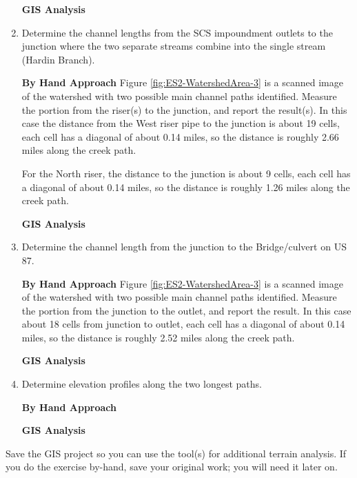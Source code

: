 \documentclass[12pt]{article}
\begin{document}
\begin{enumerate}
\textbf{GIS Analysis}

\clearpage

\item Determine the channel lengths from the SCS impoundment outlets to the junction where the two separate streams combine into the single stream (Hardin Branch).

\textbf{By Hand Approach}
Figure \ref{fig:ES2-WatershedArea-3} is a scanned image of the watershed with two possible main channel paths identified.  Measure the portion from the riser(s) to the junction, and report the result(s).  In this case the distance from the West riser pipe to the junction is about 19 cells, each cell has a diagonal of about 0.14 miles, so the distance is roughly 2.66 miles along the creek path.

For the North riser, the distance to the junction is about 9 cells, each cell has a diagonal of about 0.14 miles, so the distance is roughly 1.26 miles along the creek path.

\textbf{GIS Analysis}

\clearpage

\item Determine the channel length from the junction to the Bridge/culvert on US 87.

\textbf{By Hand Approach}
Figure \ref{fig:ES2-WatershedArea-3} is a scanned image of the watershed with two possible main channel paths identified.  Measure the portion from the junction to the outlet, and report the result.  In this case about 18 cells from junction to outlet, each cell has a diagonal of about 0.14 miles, so the distance is roughly 2.52 miles along the creek path.


\textbf{GIS Analysis}

\clearpage

\item Determine elevation profiles along the two longest paths.

\textbf{By Hand Approach}


\textbf{GIS Analysis}

\end{enumerate}

Save the GIS project so you can use the tool(s) for additional terrain analysis.  If you do the exercise by-hand, save your original work; you will need it later on.
\end{document}
